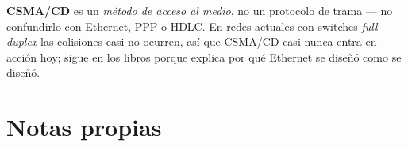 \documentclass[11pt,a4paper]{article}
\begin{document}
\begin{examfact}
\textbf{CSMA/CD} es un \emph{método de acceso al medio}, no un protocolo de trama --- no confundirlo con Ethernet, PPP o HDLC. En redes actuales con switches \textit{full-duplex} las colisiones casi no ocurren, así que CSMA/CD casi nunca entra en acción hoy; sigue en los libros porque explica por qué Ethernet se diseñó como se diseñó.
\end{examfact}

\vspace{0.5cm}
\begin{center}
\end{center}

\newpage
\section*{Notas propias}
\vspace{2cm}
\noindent
\begin{center}
\end{center}
\end{document}

